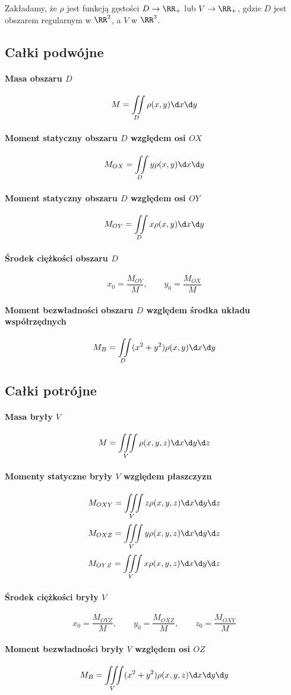 Zakładamy, że $\rho$ jest funkcją gęstości $D \to \RR_+$ lub $V \to \RR_+$, gdzie $D$ jest obszarem regularnym w $\RR^2$, a $V$ w $\RR^3$.

\subsection*{Całki podwójne}

\paragraph*{Masa obszaru $D$}
\[ M = \iint\limits_D \rho(x, y) \d x \d y \]

\paragraph*{Moment statyczny obszaru $D$ względem osi $OX$}
\[ M_{OX} = \iint\limits_D y\rho(x, y) \d x \d y \]

\paragraph*{Moment statyczny obszaru $D$ względem osi $OY$}
\[ M_{OY} = \iint\limits_D x\rho(x, y) \d x \d y \]

\paragraph*{Środek ciężkości obszaru $D$}
\[ x_0 = \frac{M_{OY}}{M}, \qquad y_0 = \frac{M_{OX}}{M} \]

\paragraph*{Moment bezwładności obszaru $D$ względem środka układu współrzędnych}
\[ M_B = \iint\limits_D (x^2 + y^2) \rho(x, y) \d x \d y \]

\subsection*{Całki potrójne}

\paragraph*{Masa bryły $V$}
\[ M = \iiint\limits_V \rho(x, y, z) \d x \d y \d z \]

\paragraph*{Momenty statyczne bryły $V$ względem płaszczyzn}
\[ M_{OXY} = \iiint\limits_V z\rho(x, y, z) \d x \d y \d z \]
\[ M_{OXZ} = \iiint\limits_V y\rho(x, y, z) \d x \d y \d z \]
\[ M_{OYZ} = \iiint\limits_V x\rho(x, y, z) \d x \d y \d z \]

\paragraph*{Środek ciężkości bryły $V$}
\[ x_0 = \frac{M_{OYZ}}{M}, \qquad y_0 = \frac{M_{OXZ}}{M}, \qquad z_0 = \frac{M_{OXY}}{M} \]

\paragraph*{Moment bezwładności bryły $V$ względem osi $OZ$}
\[ M_B = \iiint\limits_V (x^2 + y^2) \rho(x, y, z) \d x \d y \d y \]